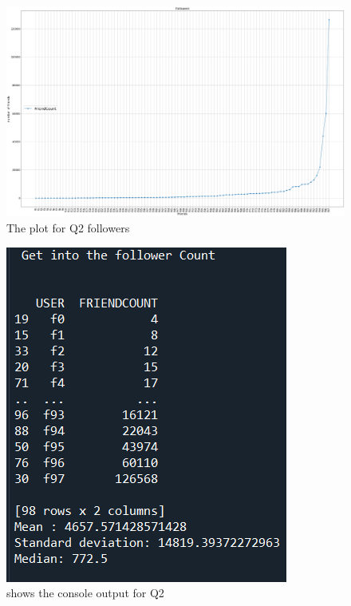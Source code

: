 \documentclass[12pt]{article}
\begin{document}
\subsection*{\color{blue}{Answer}}

\begin{figure}[H]
\centering
\includegraphics[trim=0 0 0 0, clip, width=\textwidth] {followers.PNG}
\caption{The plot for Q2 followers }
\label{fig:q2}
\end{figure}

\begin{figure}[H]
    \centering
    \includegraphics[trim=0 0 0 0, clip, width=\textwidth] {followers_console_out.png}
    \caption{shows the console output for Q2}
    \label{fig:Running output}
\end{figure}
\end{document}
